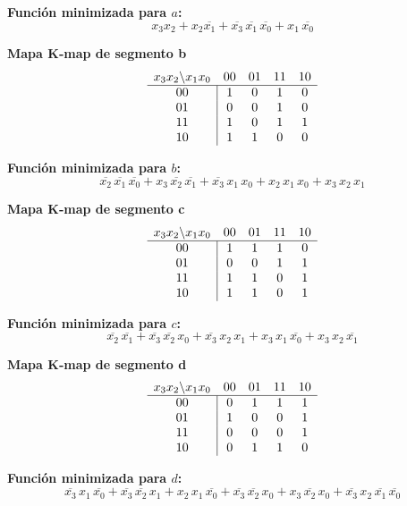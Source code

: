\documentclass[12pt]{article}
\begin{document}
\noindent
\textbf{Función minimizada para \(a\):}
\[
x_3x_2 + x_2\overline{x_1} + \overline{x_3}\,\overline{x_1}\,\overline{x_0} + x_1\,\overline{x_0}
\]

\noindent
\textbf{Mapa K‐map de segmento \textsf{b}}  
\[
\begin{array}{c|cccc}
\multicolumn{1}{c}{x_3x_2 \backslash x_1x_0} & 00 & 01 & 11 & 10 \\
\hline
00 & 1 & 0 & 1 & 0 \\
01 & 0 & 0 & 1 & 0 \\
11 & 1 & 0 & 1 & 1 \\
10 & 1 & 1 & 0 & 0 \\
\end{array}
\]
\vspace{1em}

\noindent
\textbf{Función minimizada para \(b\):}
\[
\overline{x_2}\,\overline{x_1}\,\overline{x_0} + x_3\,\overline{x_2}\,\overline{x_1} + \overline{x_3}\,x_1\,x_0 + x_2\,x_1\,x_0 + x_3\,x_2\,x_1
\]

\noindent
\textbf{Mapa K‐map de segmento \textsf{c}}  
\[
\begin{array}{c|cccc}
\multicolumn{1}{c}{x_3x_2 \backslash x_1x_0} & 00 & 01 & 11 & 10 \\
\hline
00 & 1 & 1 & 1 & 0 \\
01 & 0 & 0 & 1 & 1 \\
11 & 1 & 1 & 0 & 1 \\
10 & 1 & 1 & 0 & 1 \\
\end{array}
\]
\vspace{1em}

\noindent
\textbf{Función minimizada para \(c\):}
\[
\overline{x_2}\,\overline{x_1} + \overline{x_3}\,\overline{x_2}\,x_0 + \overline{x_3}\,x_2\,x_1 + x_3\,x_1\,\overline{x_0} + x_3\,x_2\,\overline{x_1}
\]

\noindent
\textbf{Mapa K‐map de segmento \textsf{d}}  
\[
\begin{array}{c|cccc}
\multicolumn{1}{c}{x_3x_2 \backslash x_1x_0} & 00 & 01 & 11 & 10 \\
\hline
00 & 0 & 1 & 1 & 1 \\
01 & 1 & 0 & 0 & 1 \\
11 & 0 & 0 & 0 & 1 \\
10 & 0 & 1 & 1 & 0 \\
\end{array}
\]
\vspace{1em}

\noindent
\textbf{Función minimizada para \(d\):}
\[
\overline{x_3}\,x_1\,\overline{x_0} + \overline{x_3}\,\overline{x_2}\,x_1 + x_2\,x_1\,\overline{x_0} + \overline{x_3}\,\overline{x_2}\,x_0 + x_3\,\overline{x_2}\,x_0 + \overline{x_3}\,x_2\,\overline{x_1}\,\overline{x_0}
\]
\end{document}
